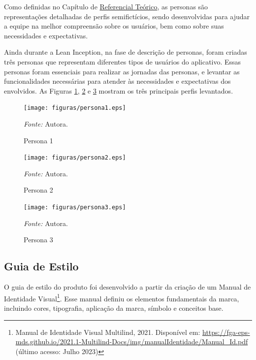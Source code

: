 Como definidas no Capítulo de \hyperref[chap:Referencial]{Referencial Teórico}, as personas são representações detalhadas de perfis semifictícios, sendo desenvolvidas para ajudar a equipe na melhor compreensão sobre os usuários, bem 
como sobre suas necessidades e expectativas. 

Ainda durante a Lean Inception, na fase de descrição de personas, foram criadas três personas que representam diferentes tipos de usuários do aplicativo. Essas personas foram essenciais para realizar as jornadas das personas, e levantar as 
funcionalidades necessárias para atender às necessidades e expectativas dos envolvidos. As Figuras \ref{fig13}, \ref{fig14} e \ref{fig15} mostram os três principais perfis levantados.

\begin{figure}[h!]
	\centering
	\caption{Persona 1}
	\begin{adjustbox}{center}
		\texttt{[image: figuras/persona1.eps]}
	\end{adjustbox}
	\begin{tablenotes}[flushleft]
		\centering
		\item \textit{Fonte:} Autora.
	\end{tablenotes}
	\label{fig13}
\end{figure}

\begin{figure}[h!]
	\centering
	\caption{Persona 2}
	\begin{adjustbox}{center}
		\texttt{[image: figuras/persona2.eps]}
	\end{adjustbox}
	\begin{tablenotes}[flushleft]
		\centering
		\item \textit{Fonte:} Autora.
	\end{tablenotes}
	\label{fig14}
\end{figure}

\begin{figure}[h!]
	\centering
	\caption{Persona 3}
	\begin{adjustbox}{center}
		\texttt{[image: figuras/persona3.eps]}
	\end{adjustbox}
	\begin{tablenotes}[flushleft]
		\centering
		\item \textit{Fonte:} Autora.
	\end{tablenotes}
	\label{fig15}
\end{figure}

\subsection{Guia de Estilo}
\label{Guia de Estilo}
O guia de estilo do produto foi desenvolvido a partir da criação de um Manual de Identidade Visual\footnote{Manual de Identidade Visual Multilind, 2021. Disponível
em: \url{https://fga-eps-mds.github.io/2021.1-Multilind-Docs/img/manualIdentidade/Manual_Id.pdf} (último acesso: Julho 2023)}. Esse manual definiu os elementos fundamentais da marca, incluindo cores, tipografia, aplicação da marca, símbolo e conceitos base.

